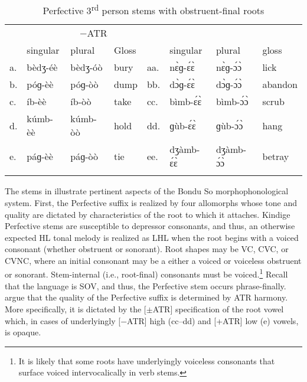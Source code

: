 \documentclass[output=paper,colorlinks,citecolor=brown]{langscibook}
\begin{document}
\begin{table}
\caption{Perfective 3\textsuperscript{rd} person stems with obstruent-final roots}
\label{tab:pfv:obs}
\begin{tabular}{ *2{l@{~~}lll} } 
    \lsptoprule
    \multicolumn{4}{c}{+ATR}&\multicolumn{4}{c}{−ATR}\\\cmidrule(lr){1-4}\cmidrule(lr){5-8}
    & singular & plural & Gloss & & singular & plural & gloss \\
    \midrule
    a. 	&	bèdʒ-éè	& bèdʒ-óò &	bury	&	aa.	& nɛ̀ɡ-ɛ́ɛ̀	& nɛ̀ɡ-ɔ́ɔ̀ &	lick	\\
    b.	&	póɡ-èè	& póɡ-òò &	dump	&   bb.	& dɔ̀ɡ-ɛ́ɛ̀	& dɔ̀ɡ-ɔ́ɔ̀ & abandon	\\\addlinespace
    c.	&	íb-èè	& íb-òò &	take	&   cc.	& bìmb-ɛ́ɛ̀	& bìmb-ɔ́ɔ̀ &	scrub	\\
    d.	&	kúmb-èè	& kúmb-òò  &  hold 	&   dd.	& ɡùb-ɛ́ɛ̀	& ɡùb-ɔ́ɔ̀  &	hang   \\\addlinespace
    e.	&	páɡ-èè	& páɡ-òò  &  tie 	&   ee.	& dʒàmb-ɛ́ɛ̀	& dʒàmb-ɔ́ɔ̀  &	betray   \\
    \lspbottomrule
\end{tabular}
\end{table}

The stems in  illustrate pertinent aspects of the Bondu So morphophonological system. First, the Perfective suffix is realized by four  allomorphs whose tone and quality are dictated by characteristics of the root to which it attaches. Kindige Perfective stems are susceptible to depressor  consonants, and thus, an otherwise expected HL tonal melody is realized as LHL when the root begins with a voiced consonant (whether obstruent or sonorant). Root shapes may be VC, CVC, or CVNC, where an initial consonant may be a either a voiced or voiceless obstruent or sonorant. Stem-internal (i.e., root-final) consonants must be voiced.\footnote{It is likely that some roots have underlyingly voiceless consonants that surface voiced intervocalically in verb stems.} Recall that the language is SOV, and thus, the Perfective stem occurs phrase-finally. \citet{HantganDavis} argue that the quality of the Perfective suffix is determined by ATR harmony. More specifically, it is dictated by the [$\pm$ATR] specification of the root vowel which, in cases of underlyingly [−ATR] high (cc--dd) and [+ATR] low (e) vowels, is opaque.
\end{document}
